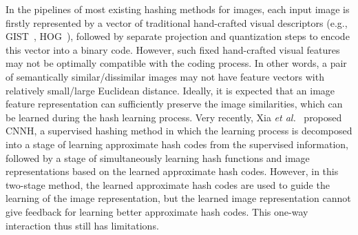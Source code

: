 \documentclass[10pt,twocolumn,letterpaper]{article}
\begin{document}
In the pipelines of most existing hashing methods for images, each
input image is firstly represented by a vector of traditional
hand-crafted visual descriptors (e.g., GIST~\cite{GIST},
HOG~\cite{HOG}), followed by separate projection and quantization steps to
encode this vector into a binary code. However, such fixed
hand-crafted visual features  may not be optimally compatible with the coding process. In other words, a pair of
semantically similar/dissimilar images may not have feature vectors
with relatively small/large Euclidean distance. Ideally, it is expected that an image feature representation can sufficiently
preserve the image similarities, which can be learned during the
hash learning process. Very recently, Xia \textit{et
al.}~\cite{CNNH} proposed CNNH, a supervised hashing method in which
the learning process is decomposed into a stage of learning
approximate hash codes from the supervised information, followed by
a stage of simultaneously learning hash functions and image
representations based on the learned approximate hash codes.
However, in this two-stage method, the learned approximate hash
codes are used to guide the learning of the image representation,
but the learned image representation cannot give feedback for learning
better approximate hash codes. This one-way interaction thus still has limitations.
\end{document}
